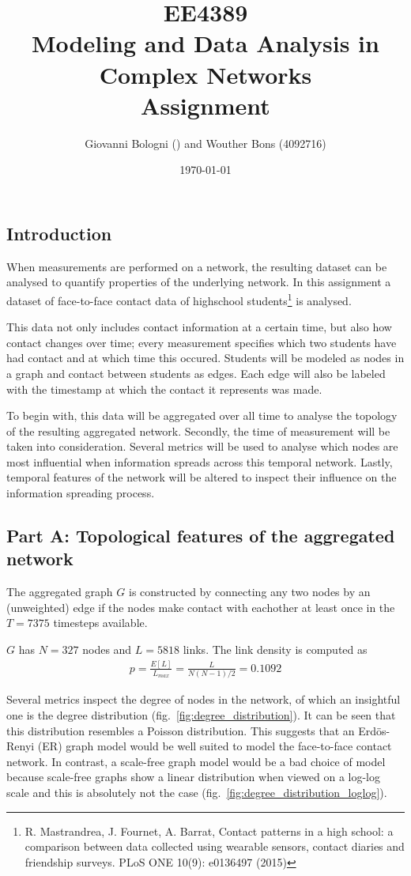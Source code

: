 \documentclass[letterpaper]{article}
\author{Giovanni Bologni (\todo{?}) and Wouther Bons (4092716)}
\date{\today}
\title{EE4389\\Modeling and Data Analysis in Complex Networks\\Assignment}
\begin{document}
\maketitle

\subsection*{Introduction}
When measurements are performed on a network, the resulting dataset can be analysed to quantify properties of the underlying network. In this assignment a dataset of face-to-face contact data of highschool students\footnote{R. Mastrandrea, J. Fournet, A. Barrat, Contact patterns in a high school: a comparison between data collected using wearable sensors, contact diaries and friendship surveys. PLoS ONE 10(9): e0136497 (2015)} is analysed.

This data not only includes contact information at a certain time, but also how contact changes over time; every measurement specifies which two students have had contact and at which time this occured. Students will be modeled as nodes in a graph and contact between students as edges. Each edge will also be labeled with the timestamp at which the contact it represents was made.

To begin with, this data will be aggregated over all time to analyse the topology of the resulting aggregated network. Secondly, the time of measurement will be taken into consideration. Several metrics will be used to analyse which nodes are most influential when information spreads across this temporal network. Lastly, temporal features of the network will be altered to inspect their influence on the information spreading process.

\subsection*{Part A: Topological features of the aggregated network}
The aggregated graph \(G\) is constructed by connecting any two nodes by an (unweighted) edge if the nodes make contact with eachother at least once in the \(T=7375\) timesteps available.

\(G\) has \(N=327\) nodes and \(L=5818\) links. The link density is computed as
\begin{align*}
p = \frac{E[L]}{L_{max}} = \frac{L}{N(N-1)/2} = 0.1092
\end{align*}

Several metrics inspect the degree of nodes in the network, of which an insightful one is the degree distribution (fig.~\ref{fig:degree_distribution}). It can be seen that this distribution resembles a Poisson distribution. This suggests that an Erdös-Renyi (ER) graph model would be well suited to model the face-to-face contact network. In contrast, a scale-free graph model would be a bad choice of model because scale-free graphs show a linear distribution when viewed on a log-log scale and this is absolutely not the case (fig.~\ref{fig:degree_distribution_loglog}).
\end{document}
